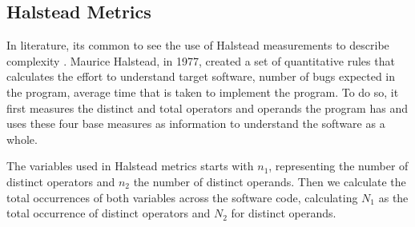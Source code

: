 \subsection{Halstead Metrics}

In literature, its common to see the use of Halstead measurements to describe complexity \cite{article:complexity_with_halstead}.
Maurice Halstead, in 1977, created a set of quantitative rules that calculates the effort to understand target software, number of bugs
expected in the program, average time that is taken to implement the program. To do so, it first measures the distinct and total
operators and operands the program has and uses these four base measures as information to understand the software as a whole.

The variables used in Halstead metrics starts with $n_{1}$, representing the number of distinct operators and $n_{2}$ the
number of distinct operands. Then we calculate the total occurrences of both variables across the software code, calculating
$N_{1}$ as the total occurrence of distinct operators and $N_{2}$ for distinct operands.

